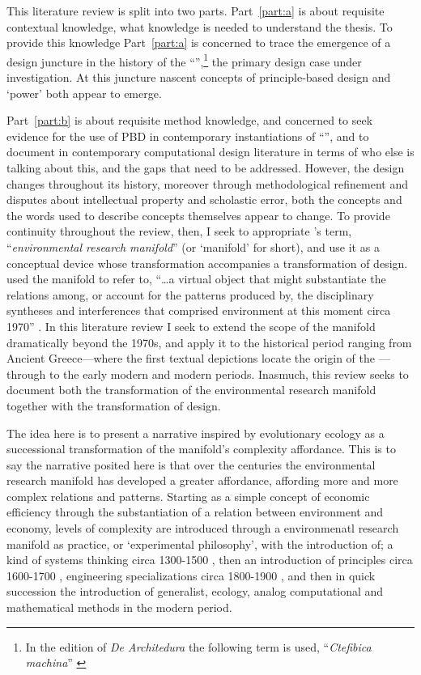 \documentclass[a4paper, 12pt]{article}
\begin{document}
This literature review is split into two parts. Part~\ref{part:a} is about requisite contextual knowledge, what knowledge is needed to understand the thesis. To provide this knowledge Part~\ref{part:a} is concerned to trace the emergence of a design juncture in the history of the ``\SE'',\footnote{In the \citeyear{vitruviusArchitedura1567} edition of \textit{De Architedura} the following term is used, ``\textit{Ctefibica machina}'' \citet[p.~347]{vitruviusArchitedura1567}} the primary design case under investigation. At this juncture nascent concepts of principle-based design and `power' both appear to emerge. 

Part~\ref{part:b} is about requisite method knowledge, and concerned to seek evidence for the use of PBD in contemporary instantiations of ``\SE'', and to document in contemporary computational design literature in terms of who else is talking about this, and the gaps that need to be addressed. However, the \SEs design changes throughout its history, moreover through methodological refinement and disputes about intellectual property and scholastic error, both the concepts and the words used to describe concepts themselves appear to change. To provide continuity throughout the review, then, I seek to appropriate \citeauthor{busbea_responsive_2019}'s term, ``\textit{environmental research manifold}'' (or `manifold' for short), and use it as a conceptual device whose transformation accompanies a transformation of \SEs design. \citeauthor{busbea_responsive_2019} used the manifold to refer to, ``\dots a virtual object that might substantiate the relations among, or account for the patterns produced by, the disciplinary syntheses and interferences that comprised environment at this moment circa 1970'' \citep[p.~xxi]{busbea_responsive_2019}. In this literature review I seek to extend the scope of the manifold dramatically beyond the 1970s, and  apply it to the historical period ranging from Ancient Greece---where the first textual depictions locate the origin of the \SE---through to the early modern and modern periods. Inasmuch, this review seeks to document both the transformation of the environmental research manifold together with the transformation of \SEs design.

The idea here is to present a narrative inspired by evolutionary ecology as a successional transformation of the manifold's complexity affordance. This is to say the narrative posited here is that over the centuries the environmental research manifold has developed a greater affordance, affording more and more complex relations and patterns. Starting as a simple concept of economic efficiency through the substantiation of a relation between environment and economy, levels of complexity are introduced through a environmenatl research manifold as practice, or `experimental philosophy', with the introduction of; a kind of systems thinking circa 1300-1500 \CE, then an introduction of principles circa 1600-1700 \CE, engineering specializations circa 1800-1900 \CE, and then in quick succession the introduction of generalist, ecology, analog computational and mathematical methods in the modern period. 
\end{document}
